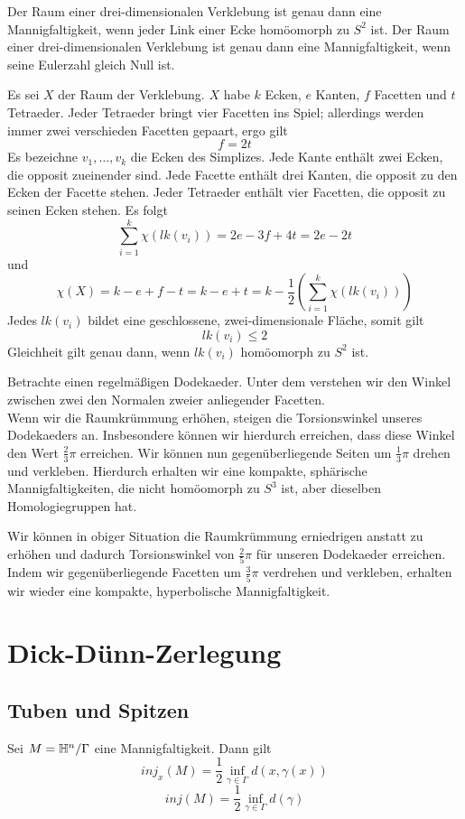 \documentclass{book}
\begin{document}
\Prop{}
Der Raum einer drei-dimensionalen Verklebung ist genau dann eine Mannigfaltigkeit, wenn jeder Link einer Ecke homöomorph zu $S^2$ ist.
\Prop{}
Der Raum einer drei-dimensionalen Verklebung ist genau dann eine Mannigfaltigkeit, wenn seine Eulerzahl gleich Null ist.
\begin{Beweis}{}
	Es sei $X$ der Raum der Verklebung. $X$ habe $k$ Ecken, $e$ Kanten, $f$ Facetten und $t$ Tetraeder. Jeder Tetraeder bringt vier Facetten ins Spiel; allerdings werden immer zwei verschieden Facetten gepaart, ergo gilt
	\[ f = 2t \]
	Es bezeichne $v_1,\ldots, v_k$ die Ecken des Simplizes. Jede Kante enthält zwei Ecken, die opposit zueinender sind. Jede Facette enthält drei Kanten, die opposit zu den Ecken der Facette stehen. Jeder Tetraeder enthält vier Facetten, die opposit zu seinen Ecken stehen. Es folgt
	\[ \sum_{i=1}^k \chi(lk(v_i)) = 2e - 3f + 4t = 2e - 2t \]
	und
	\[ \chi(X) = k - e+f-t = k -e + t = k - \frac{1}{2}(\sum_{i=1}^k \chi(lk(v_i))) \]
	Jedes $lk(v_i)$ bildet eine geschlossene, zwei-dimensionale Fläche, somit gilt
	\[ lk(v_i) \leq 2 \]
	Gleichheit gilt genau dann, wenn $lk(v_i)$ homöomorph zu $S^2$ ist.
\end{Beweis}

Betrachte einen regelmäßigen Dodekaeder. Unter dem  verstehen wir den Winkel zwischen zwei den Normalen zweier anliegender Facetten.\\
Wenn wir die Raumkrümmung erhöhen, steigen die Torsionswinkel unseres Dodekaeders an. Insbesondere können wir hierdurch erreichen, dass diese Winkel den Wert $\frac{2}{3}\pi$ erreichen. Wir können nun gegenüberliegende Seiten um $\frac{1}{3}\pi$ drehen und verkleben. Hierdurch erhalten wir eine kompakte, sphärische Mannigfaltigkeiten, die nicht homöomorph zu $S^3$ ist, aber dieselben Homologiegruppen hat.

Wir können in obiger Situation die Raumkrümmung erniedrigen anstatt zu erhöhen und dadurch Torsionswinkel von $\frac{2}{5} \pi$ für unseren Dodekaeder erreichen. Indem wir gegenüberliegende Facetten um $\frac{3}{5}\pi$ verdrehen und verkleben, erhalten wir wieder eine kompakte, hyperbolische Mannigfaltigkeit.

\chapter{Dick-Dünn-Zerlegung}
\section{Tuben und Spitzen}
\Prop{}
Sei $M = \mathbb{H}^n / \Gamma$ eine Mannigfaltigkeit. Dann gilt
\[ inj_x(M) = \frac{1}{2}\inf_{\gamma \in \Gamma} d(x, \gamma(x))  \]
\Kor{}
\[ inj(M) = \frac{1}{2}\inf_{\gamma \in \Gamma} d(\gamma) \]
\end{document}
